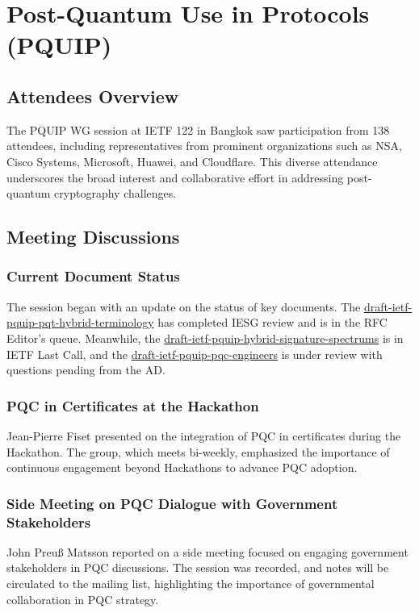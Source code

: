 \documentclass{article}
\begin{document}
\newpage

\section{Post-Quantum Use in Protocols (PQUIP)}

\subsection{Attendees Overview}
The PQUIP WG session at IETF 122 in Bangkok saw participation from 138 attendees, including representatives from prominent organizations such as NSA, Cisco Systems, Microsoft, Huawei, and Cloudflare. This diverse attendance underscores the broad interest and collaborative effort in addressing post-quantum cryptography challenges.

\subsection{Meeting Discussions}

\subsubsection{Current Document Status}
The session began with an update on the status of key documents. The \href{https://datatracker.ietf.org/doc/html/draft-ietf-pquip-pqt-hybrid-terminology}{draft-ietf-pquip-pqt-hybrid-terminology} has completed IESG review and is in the RFC Editor's queue. Meanwhile, the \href{https://datatracker.ietf.org/doc/html/draft-ietf-pquip-hybrid-signature-spectrums}{draft-ietf-pquip-hybrid-signature-spectrums} is in IETF Last Call, and the \href{https://datatracker.ietf.org/doc/html/draft-ietf-pquip-pqc-engineers}{draft-ietf-pquip-pqc-engineers} is under review with questions pending from the AD.

\subsubsection{PQC in Certificates at the Hackathon}
Jean-Pierre Fiset presented on the integration of PQC in certificates during the Hackathon. The group, which meets bi-weekly, emphasized the importance of continuous engagement beyond Hackathons to advance PQC adoption.

\subsubsection{Side Meeting on PQC Dialogue with Government Stakeholders}
John Preuß Matsson reported on a side meeting focused on engaging government stakeholders in PQC discussions. The session was recorded, and notes will be circulated to the mailing list, highlighting the importance of governmental collaboration in PQC strategy.
\end{document}
